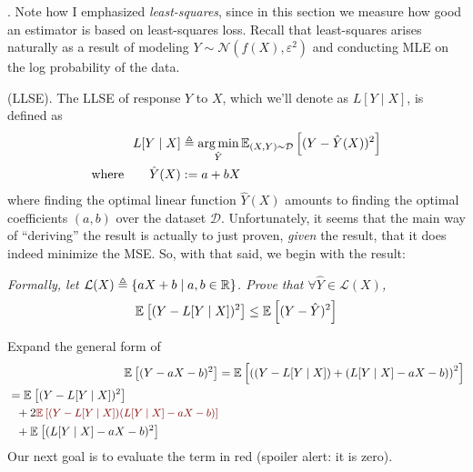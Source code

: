 \documentclass[11pt]{article}
\begin{document}
\myspace{}
\p {}. Note how I emphasized \textit{least-squares}, since in this section we measure how good an estimator is based on least-squares loss. Recall that least-squares arises naturally as a result of modeling $Y \sim \mathcal{N}(f(X), \varepsilon^2)$ and conducting MLE on the log probability of the data. 
\begin{compactitem}
	\item {} (LLSE). The LLSE of response $Y$ to $X$, which we'll denote as $L[Y \mid X]$, is defined as 
	\begin{align}
		L[Y \mid X] &\triangleq 
			\argmin_{\hat Y} \E[(X, Y) \sim \mathcal D]{(Y - \hat Y(X))^2} \\
		\text{where}\qquad
		\hat Y(X) &:= a + b X
	\end{align}
	where finding the optimal linear function $\hat Y(X)$ amounts to finding the optimal coefficients $(a, b)$ over the dataset $\mathcal D$. Unfortunately, it seems that the main way of ``deriving'' the result is actually to just proven, \textit{given} the result, that it does indeed minimize the MSE. So, with that said, we begin with the result:
	\begin{algorithm}
		\textit{Formally, let $\mathcal L(X) \triangleq \{ aX + b \mid a, b \in \R \}$. Prove that $\forall \hat{Y} \in \mathcal L(X)$, 
			\begin{align}
				\E{(Y - L[Y \mid X])^2} \le \E{(Y - \hat Y)^2}
			\end{align}
			}
		\tcblower 
		
		\begin{compactenum}
			\item Expand the general form of 
			\begin{align}
				\E{(Y - aX - b)^2}
					&= \E{\left( \left(Y - L[Y \mid X] \right) +  \left(L[Y \mid X] - aX - b \right)  \right)^2} \\
				\begin{split}
					&= \E{(Y - L[Y \mid X])^2} \\
						&~~+ 2 \mred{\E{(Y - L[Y \mid X])(L[Y \mid X] - aX - b)}} \\
						&~~+ \E{(L[Y \mid X] - aX - b)^2}
				\end{split}
			\end{align}
			Our next goal is to evaluate the term in red (spoiler alert: it is zero).
			

\end{compactenum}
\end{algorithm}
\end{compactitem}
\end{document}
